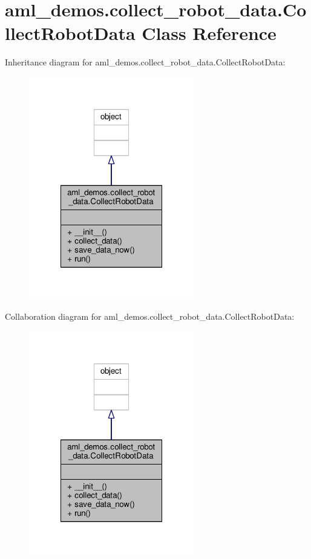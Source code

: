 \hypertarget{classaml__demos_1_1collect__robot__data_1_1_collect_robot_data}{\section{aml\-\_\-demos.\-collect\-\_\-robot\-\_\-data.\-Collect\-Robot\-Data Class Reference}
\label{classaml__demos_1_1collect__robot__data_1_1_collect_robot_data}
}


Inheritance diagram for aml\-\_\-demos.\-collect\-\_\-robot\-\_\-data.\-Collect\-Robot\-Data\-:
\nopagebreak
\begin{figure}[H]
\begin{center}
\leavevmode
\includegraphics[width=204pt]{classaml__demos_1_1collect__robot__data_1_1_collect_robot_data__inherit__graph}
\end{center}
\end{figure}


Collaboration diagram for aml\-\_\-demos.\-collect\-\_\-robot\-\_\-data.\-Collect\-Robot\-Data\-:
\nopagebreak
\begin{figure}[H]
\begin{center}
\leavevmode
\includegraphics[width=204pt]{classaml__demos_1_1collect__robot__data_1_1_collect_robot_data__coll__graph}
\end{center}
\end{figure}
